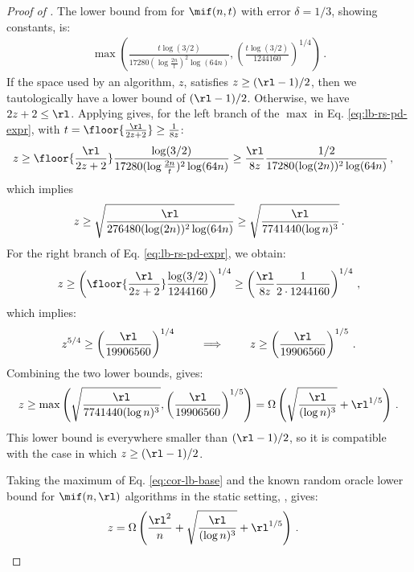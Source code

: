 \begin{proof}[Proof of ]
  The lower bound from  for $\mif(n,t)$ with error $\delta = 1/3$, showing constants, is:
  \begin{align}
    \max\left(\frac{t \log(3/2)}{17280 (\log\frac{2 n}{t})^2 \log(64n)},\left(\frac{t \log(3/2)}{1244160}\right)^{1/4}\right) \,.\label{eq:lb-rs-pd-expr}
  \end{align}
  If the space used by an algorithm, $z$, satisfies $z \ge (\rl-1)/2$, then we tautologically have a lower bound of $(\rl-1)/2$. Otherwise, we have $2z+2 \le \rl$.
  Applying  gives, for the left branch of the $\max$ in Eq. \ref{eq:lb-rs-pd-expr}, with $t = \floor{\frac{\rl}{2 z + 2}} \ge \frac{1}{8 z}$:
  \begin{align*}
    z &\ge \floor{\frac{\rl}{2 z + 2}} \frac{\log(3/2)}{17280 (\log\frac{2 n}{t})^2 \log(64n)} \ge \frac{\rl}{8 z} \frac{1/2}{17280 (\log (2 n))^2 \log(64n)} \,,
  \end{align*}
  which implies
  \begin{align*}
    z \ge \sqrt{\frac{\rl}{276480 (\log (2 n))^2 \log(64n)}} \ge  \sqrt{\frac{\rl}{7741440 (\log n)^3}} \,.
  \end{align*}
  For the right branch of Eq. \ref{eq:lb-rs-pd-expr}, we obtain:
  \begin{align*}
    z \ge \left(\floor{\frac{\rl}{2 z + 2}} \frac{\log(3/2)}{1244160}\right)^{1/4} \ge \left(\frac{\rl}{8 z} \frac{1}{2 \cdot 1244160}\right)^{1/4} \,,
  \end{align*}
  which implies:
  \begin{align*}
    z^{5/4} \ge \left(\frac{\rl}{19906560}\right)^{1/4} \qquad \implies \qquad z \ge \left(\frac{\rl}{19906560}\right)^{1/5} \,.
  \end{align*}
  Combining the two lower bounds, gives:
  \begin{align}
    z \ge \max\left(\sqrt{\frac{\rl}{7741440 (\log n)^3}}, \left(\frac{\rl}{19906560}\right)^{1/5}\right) = \Omega\left(\sqrt{\frac{\rl}{(\log n)^3}} + \rl^{1/5}\right) \,. \label{eq:cor-lb-base}
  \end{align}
  This lower bound is everywhere smaller than $(\rl-1)/2$, so it is compatible with the case in which $z \ge (\rl-1)/2$. 
  
  Taking the maximum of Eq. \ref{eq:cor-lb-base} and the known random oracle lower bound for $\mif(n,\rl)$ algorithms in the static setting, , gives:
  \begin{align*}
    z &= \Omega\left(\frac{\rl^2}{n} + \sqrt{\frac{\rl}{(\log n)^3}} + \rl^{1/5}\right)  \,. \qedhere
  \end{align*}
  
\end{proof}

\endinput

